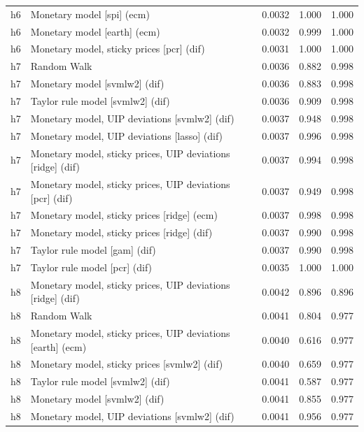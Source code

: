 \begin{ThreePartTable}
\begin{longtable}[t]{cp{5.5cm}ccc}
h6 & \raggedright Monetary model [spi] (ecm) & 0.0032 & 1.000 & 1.000\\
h6 & \raggedright Monetary model [earth] (ecm) & 0.0032 & 0.999 & 1.000\\
h6 & \raggedright Monetary model, sticky prices [pcr] (dif) & 0.0031 & 1.000 & 1.000\\
\addlinespace
h7 & \raggedright Random Walk & 0.0036 & 0.882 & 0.998\\
h7 & \raggedright Monetary model [svmlw2] (dif) & 0.0036 & 0.883 & 0.998\\
h7 & \raggedright Taylor rule model [svmlw2] (dif) & 0.0036 & 0.909 & 0.998\\
h7 & \raggedright Monetary model, UIP deviations [svmlw2] (dif) & 0.0037 & 0.948 & 0.998\\
h7 & \raggedright Monetary model, UIP deviations [lasso] (dif) & 0.0037 & 0.996 & 0.998\\
h7 & \raggedright Monetary model, sticky prices, UIP deviations [ridge] (dif) & 0.0037 & 0.994 & 0.998\\
h7 & \raggedright Monetary model, sticky prices, UIP deviations [pcr] (dif) & 0.0037 & 0.949 & 0.998\\
h7 & \raggedright Monetary model, sticky prices [ridge] (ecm) & 0.0037 & 0.998 & 0.998\\
h7 & \raggedright Monetary model, sticky prices [ridge] (dif) & 0.0037 & 0.990 & 0.998\\
h7 & \raggedright Taylor rule model [gam] (dif) & 0.0037 & 0.990 & 0.998\\
h7 & \raggedright Taylor rule model [pcr] (dif) & 0.0035 & 1.000 & 1.000\\
\addlinespace
h8 & \raggedright Monetary model, sticky prices, UIP deviations [ridge] (dif) & 0.0042 & 0.896 & 0.896\\
h8 & \raggedright Random Walk & 0.0041 & 0.804 & 0.977\\
h8 & \raggedright Monetary model, sticky prices, UIP deviations [earth] (ecm) & 0.0040 & 0.616 & 0.977\\
h8 & \raggedright Monetary model, sticky prices [svmlw2] (dif) & 0.0040 & 0.659 & 0.977\\
h8 & \raggedright Taylor rule model [svmlw2] (dif) & 0.0041 & 0.587 & 0.977\\
h8 & \raggedright Monetary model [svmlw2] (dif) & 0.0041 & 0.855 & 0.977\\
h8 & \raggedright Monetary model, UIP deviations [svmlw2] (dif) & 0.0041 & 0.956 & 0.977\\

\end{longtable}
\end{ThreePartTable}

